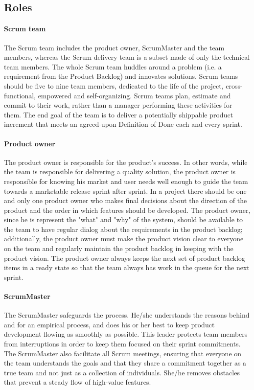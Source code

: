 \documentclass[11pt]{article}
\begin{document}
\subsection{Roles}
\paragraph{Scrum team} The Scrum team includes the product owner, ScrumMaster and the team members, whereas the Scrum delivery team is a subset made of only the technical team members. The whole Scrum team huddles around a problem (i.e. a requirement from the Product Backlog) and innovates solutions. Scrum teams should be five to nine team members, dedicated to the life of the project, cross-functional, empowered and self-organizing. Scrum teams plan, estimate and commit to their work, rather than a manager performing these activities for them. The end goal of the team is to deliver a potentially shippable product increment that meets an agreed-upon Definition of Done each and every sprint.
\paragraph{Product owner} The product owner is responsible for the product's success. In other words, while the team is responsible for delivering a quality solution, the product owner is responsible for knowing his market and user needs well enough to guide the team towards a marketable release sprint after sprint. In a project there should be one and only one product owner who makes final decisions about the direction of the product and the order in which features should be developed. The product owner, since he is represent the "what" and "why" of the system, should be available to the team to have regular dialog about the requirements in the product backlog; additionally, the product owner must make the product vision clear to everyone on the team and regularly maintain the product backlog in keeping with the product vision. The product owner always keeps the next set of product backlog items in a ready state so that the team always has work in the queue for the next sprint.
\paragraph{ScrumMaster} The ScrumMaster safeguards the process. He/she understands the reasons behind and for an empirical process, and does his or her best to keep product development flowing as smoothly as possible. This leader protects team members from interruptions in order to keep them focused on their sprint commitments. The ScrumMaster also facilitate all Scrum meetings, ensuring that everyone on the team understands the goals and that they share a commitment together as a true team and not just as a collection of individuals. She/he removes obstacles that prevent a steady flow of high-value features.
\end{document}
